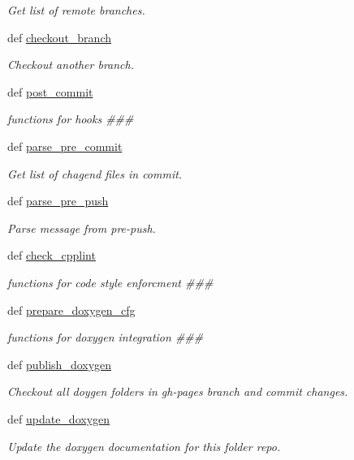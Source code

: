 \begin{DoxyCompactItemize}
\begin{DoxyCompactList}\small\item\em Get list of remote branches. \end{DoxyCompactList}\item 
def \hyperlink{classgithookcontroller_1_1GitHookController_aba5b2ce717c869648bc8804c9ba96b3b}{checkout\-\_\-branch}
\begin{DoxyCompactList}\small\item\em Checkout another branch. \end{DoxyCompactList}\item 
def \hyperlink{classgithookcontroller_1_1GitHookController_aafe2c7cbed97963e0295cfbae0136058}{post\-\_\-commit}
\begin{DoxyCompactList}\small\item\em functions for hooks \#\#\# \end{DoxyCompactList}\item 
def \hyperlink{classgithookcontroller_1_1GitHookController_a99438b6d511dfb4a3d98624318f2b8dd}{parse\-\_\-pre\-\_\-commit}
\begin{DoxyCompactList}\small\item\em Get list of chagend files in commit. \end{DoxyCompactList}\item 
def \hyperlink{classgithookcontroller_1_1GitHookController_afc24ced7e8d3a9a5a605b0de22e949a8}{parse\-\_\-pre\-\_\-push}
\begin{DoxyCompactList}\small\item\em Parse message from pre-\/push. \end{DoxyCompactList}\item 
def \hyperlink{classgithookcontroller_1_1GitHookController_a67a1f8d4dd8d4941c4b7409d972c7766}{check\-\_\-cpplint}
\begin{DoxyCompactList}\small\item\em functions for code style enforcment \#\#\# \end{DoxyCompactList}\item 
def \hyperlink{classgithookcontroller_1_1GitHookController_afa6bd69c6d0a9e9654cec6e3aeab34a8}{prepare\-\_\-doxygen\-\_\-cfg}
\begin{DoxyCompactList}\small\item\em functions for doxygen integration \#\#\# \end{DoxyCompactList}\item 
def \hyperlink{classgithookcontroller_1_1GitHookController_abd2d8e22fd8772e5c586748a0605cbe3}{publish\-\_\-doxygen}
\begin{DoxyCompactList}\small\item\em Checkout all doygen folders in gh-\/pages branch and commit changes. \end{DoxyCompactList}\item 
def \hyperlink{classgithookcontroller_1_1GitHookController_a256c5c260e76ab6da328a334af64e13e}{update\-\_\-doxygen}
\begin{DoxyCompactList}\small\item\em Update the doxygen documentation for this folder repo. \end{DoxyCompactList}\end{DoxyCompactItemize}

